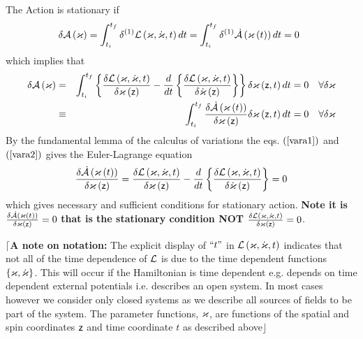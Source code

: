 The Action is stationary if 
\begin{equation}
\delta {\cal A}\left( \varkappa \right) =\int_{t_{i}}^{t_{f}}\delta ^{\left(
1\right) }{\cal L}\left( \varkappa ,\dot{\varkappa},t\right)
dt=\int_{t_{i}}^{t_{f}}\delta ^{\left( 1\right) }{\cal \dot{A}}\left(
\varkappa \left( t\right) \right) dt=0\,\text{ }
\end{equation}%
which implies that 
\begin{eqnarray}
\delta {\cal A}\left( \varkappa \right) &=&\int_{t_{i}}^{t_{f}}\left\{ \frac{%
\delta {\cal L}\left( {\cal \varkappa },{\cal \dot{\varkappa}},t\right) }{%
\delta {\cal \varkappa }\left( {\sf z}\right) }-\frac{d}{dt}\left\{ \frac{%
\delta {\cal L}\left( {\cal \varkappa },{\cal \dot{\varkappa}},t\right) }{%
\delta {\cal \dot{\varkappa}}\left( {\sf z}\right) }\right\} \right\} \delta
\varkappa \left( {\sf z},t\right) dt=0\quad \forall \delta \varkappa
\label{vara1} \\
&\equiv &\int_{t_{i}}^{t_{f}}\frac{\delta {\cal \dot{A}}\left( \varkappa
\left( t\right) \right) }{\delta {\cal \varkappa }\left( {\sf z}\right) }%
\delta \varkappa \left( {\sf z},t\right) dt=0\quad \forall \delta \varkappa
\label{vara2}
\end{eqnarray}%
By the fundamental lemma of the calculus of variations the eqs. $\left( \ref%
{vara1}\right) $ and $\left( \ref{vara2}\right) $ gives the Euler-Lagrange
equation%
\begin{equation}
\frac{\delta {\cal \dot{A}}\left( \varkappa \left( t\right) \right) }{\delta 
{\cal \varkappa }\left( {\sf z}\right) }=\frac{\delta {\cal L}\left( {\cal %
\varkappa },{\cal \dot{\varkappa}},t\right) }{\delta {\cal \varkappa }\left( 
{\sf z}\right) }-\frac{d}{dt}\left\{ \frac{\delta {\cal L}\left( {\cal %
\varkappa },{\cal \dot{\varkappa}},t\right) }{\delta {\cal \dot{\varkappa}}%
\left( {\sf z}\right) }\right\} =0
\end{equation}%
which gives necessary and sufficient conditions for stationary action. {\bf %
Note it is }$\frac{\delta {\cal \dot{A}}\left( \varkappa \left( t\right)
\right) }{\delta {\cal \varkappa }\left( {\sf z}\right) }=0$ {\bf that is
the stationary condition NOT }$\frac{\delta {\cal L}\left( {\cal \varkappa },%
{\cal \dot{\varkappa}},t\right) }{\delta {\cal \varkappa }\left( {\sf z}%
\right) }=0$.

$\lceil ${\bf A note on notation: }The explicit display of $``t"$ in ${\cal L%
}\left( {\cal \varkappa },{\cal \dot{\varkappa}},t\right) $ indicates that
not all of the time dependence of ${\cal L}$ is due to the time dependent
functions $\left\{ {\cal \varkappa },{\cal \dot{\varkappa}}\right\} $. This
will occur if the Hamiltonian is time dependent e.g. depends on time
dependent external potentials i.e. describes an open system. In most cases
however we consider only closed systems as we describe all sources of fields
to be part of the system. The parameter functions, ${\cal \varkappa }$, are
functions of the spatial and spin coordinates ${\sf z}$ and time coordinate $%
t$ as described above$\rfloor $

